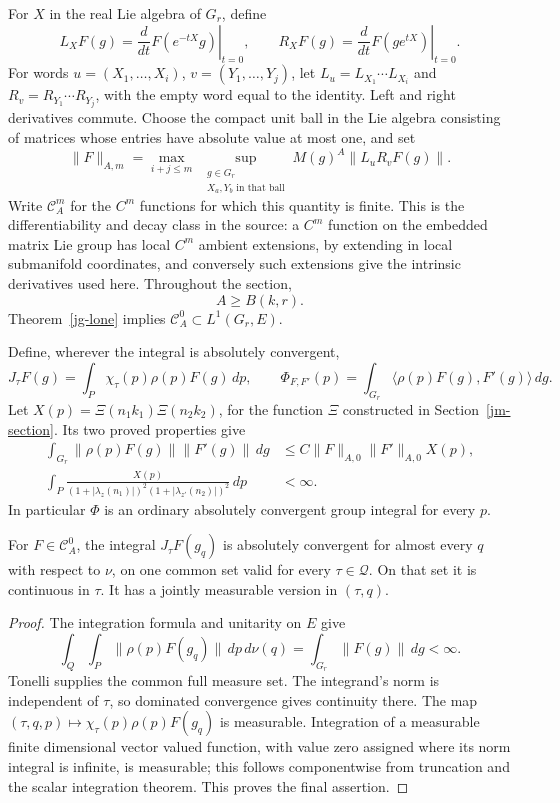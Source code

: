 For \(X\) in the real Lie algebra of \(G_r\), define
\[
 L_XF(g)=\left.\frac d{dt}F(e^{-tX}g)\right|_{t=0},
 \qquad
 R_XF(g)=\left.\frac d{dt}F(ge^{tX})\right|_{t=0}.
\]
For words \(u=(X_1,\ldots,X_i)\), \(v=(Y_1,\ldots,Y_j)\),
let \(L_u=L_{X_1}\cdots L_{X_i}\) and
\(R_v=R_{Y_1}\cdots R_{Y_j}\), with the empty word equal to
the identity.  Left and right derivatives commute.
Choose the compact unit ball in the Lie algebra consisting of
matrices whose entries have absolute value at most one, and set
\[
 \|F\|_{A,m}
 =\max_{i+j\leq m}\ 
      \sup_{\substack{g\in G_r\\X_a,Y_b\text{ in that ball}}}
        M(g)^A\|L_uR_vF(g)\|.
\]
Write \(\mathcal C_A^m\) for the \(C^m\) functions for which this
quantity is finite.  This is the differentiability and decay class
in the source: a \(C^m\) function on the embedded matrix Lie group
has local \(C^m\) ambient extensions, by extending in local
submanifold coordinates, and conversely such extensions give the
intrinsic derivatives used here.
Throughout the section,
\[
                         A\geq B(k,r).
\]
Theorem~\ref{jg-lone} implies
\(\mathcal C_A^0\subset L^1(G_r,E)\).

Define, wherever the integral is absolutely convergent,
\[
 J_\tau F(g)=\int_P\chi_\tau(p)\rho(p)F(g)\,dp,\qquad
 \Phi_{F,F'}(p)=\int_{G_r}
                  \langle\rho(p)F(g),F'(g)\rangle\,dg.
\]
Let \(X(p)=\Xi(n_1k_1)\Xi(n_2k_2)\), for the function
\(\Xi\) constructed in Section~\ref{jm-section}.
Its two proved properties give
\begin{align}
 \int_{G_r}\|\rho(p)F(g)\|\|F'(g)\|\,dg
       &\leq C\|F\|_{A,0}\|F'\|_{A,0}X(p),
                                      \label{jp-coef}\\
 \int_P\frac{X(p)}
       {(1+|\lambda_z(n_1)|)^2(1+|\lambda_{z'}(n_2)|)^2}\,dp
       &<\infty .                     \label{jp-xi}
\end{align}
In particular \(\Phi\) is an ordinary absolutely convergent
group integral for every \(p\).

\begin{lemma}\label{jp-orbital}
For \(F\in\mathcal C_A^0\), the integral \(J_\tau F(g_q)\)
is absolutely convergent for almost every \(q\) with respect to
\(\nu\), on one common set valid for every \(\tau\in\mathcal Q\).
On that set it is continuous in \(\tau\).
It has a jointly measurable version in \((\tau,q)\).
\end{lemma}

\begin{proof}
The integration formula and unitarity on \(E\) give
\[
 \int_Q\int_P\|\rho(p)F(g_q)\|\,dp\,d\nu(q)
                         =\int_{G_r}\|F(g)\|\,dg<\infty .
\]
Tonelli supplies the common full measure set.
The integrand's norm is independent of \(\tau\), so dominated
convergence gives continuity there.
The map \((\tau,q,p)\mapsto\chi_\tau(p)\rho(p)F(g_q)\) is
measurable.  Integration of a measurable finite dimensional
vector valued function, with value zero assigned where its
norm integral is infinite, is measurable; this follows
componentwise from truncation and the scalar integration
theorem.  This proves the final assertion.
\end{proof}

